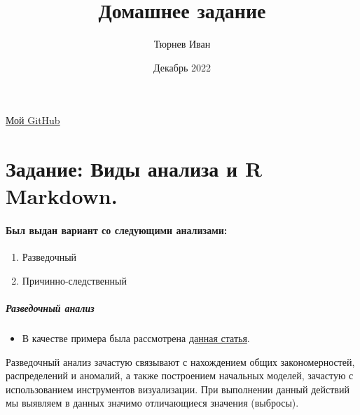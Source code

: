 \documentclass[
]{article}
\title{Домашнее задание}
\author{Тюрнев Иван}
\date{Декабрь 2022}
\providecommand{\tightlist}{%
  \setlength{\itemsep}{0pt}\setlength{\parskip}{0pt}}
\begin{document}
\maketitle

\href{https://github.com/XuTPuK99/work_R_1}{Мой GitHub}

\hypertarget{ux437ux430ux434ux430ux43dux438ux435-ux432ux438ux434ux44b-ux430ux43dux430ux43bux438ux437ux430-ux438-r-markdown.}{%
\section{Задание: Виды анализа и R
Markdown.}\label{ux437ux430ux434ux430ux43dux438ux435-ux432ux438ux434ux44b-ux430ux43dux430ux43bux438ux437ux430-ux438-r-markdown.}}

\hypertarget{ux431ux44bux43b-ux432ux44bux434ux430ux43d-ux432ux430ux440ux438ux430ux43dux442-ux441ux43e-ux441ux43bux435ux434ux443ux44eux449ux438ux43cux438-ux430ux43dux430ux43bux438ux437ux430ux43cux438}{%
\paragraph{Был выдан вариант со следующими
анализами:}\label{ux431ux44bux43b-ux432ux44bux434ux430ux43d-ux432ux430ux440ux438ux430ux43dux442-ux441ux43e-ux441ux43bux435ux434ux443ux44eux449ux438ux43cux438-ux430ux43dux430ux43bux438ux437ux430ux43cux438}}

\begin{enumerate}
\def\labelenumi{\arabic{enumi}.}
\tightlist
\item
  Разведочный
\item
  Причинно-следственный
\end{enumerate}

\hypertarget{ux440ux430ux437ux432ux435ux434ux43eux447ux43dux44bux439-ux430ux43dux430ux43bux438ux437}{%
\subparagraph{\texorpdfstring{\textbf{Разведочный
анализ}}{Разведочный анализ}}\label{ux440ux430ux437ux432ux435ux434ux43eux447ux43dux44bux439-ux430ux43dux430ux43bux438ux437}}

\begin{itemize}
\tightlist
\item
  В качестве примера была рассмотрена
  \href{https://cyberleninka.ru/article/n/obrabotka-i-razvedochnyy-analiz-chislovyh-massivov-dannyh}{данная
  статья}.
\end{itemize}

Разведочный анализ зачастую связывают с нахождением общих
закономерностей, распределений и аномалий, а также построением начальных
моделей, зачастую с использованием инструментов визуализации. При
выполнении данный действий мы выявляем в данных значимо отличающиеся
значения (выбросы).
\end{document}
